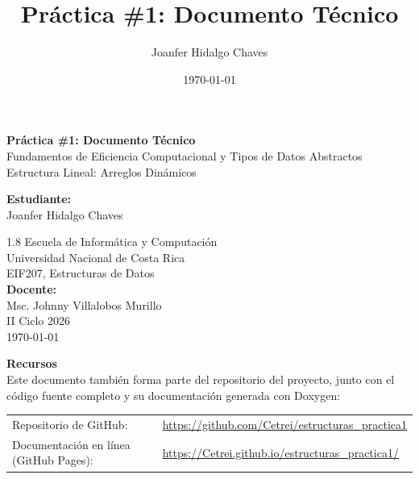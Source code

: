 \documentclass[12pt,letterpaper]{article}
\title{Práctica \#1: Documento Técnico}
\author{Joanfer Hidalgo Chaves}
\date{\today}
\begin{document}

\begin{titlepage}
\centering
\vspace*{1.5cm}

\Large{\textbf{Práctica \#1: Documento Técnico}}\\[6pt]
\large{Fundamentos de Eficiencia Computacional y Tipos de Datos Abstractos}\\[6pt]
Estructura Lineal: Arreglos Dinámicos\\

\vspace{1.5cm}

\textbf{Estudiante:}\\
Joanfer Hidalgo Chaves

\vspace{1.5cm}

\begin{spacing}{1.8}
Escuela de Informática y Computación\\
Universidad Nacional de Costa Rica\\
EIF207, Estructuras de Datos\\[10pt]
\textbf{Docente:} \\
Msc. Johnny Villalobos Murillo\\[1.5cm]
II Ciclo 2026\\
\today
\end{spacing}

\vfill
\end{titlepage}

\newpage
\tableofcontents

\begin{center}
\begin{minipage}{1\textwidth}
\centering
\small
\textbf{Recursos} \\[0.3em]
Este documento también forma parte del repositorio del proyecto, junto con el código fuente completo y su documentación generada con Doxygen:
\vspace{0.3em}

\begin{tabular}{ll}
Repositorio de GitHub: & \url{https://github.com/Cetrei/estructuras_practica1} \\
Documentación en línea (GitHub Pages): & \url{https://Cetrei.github.io/estructuras_practica1/} \\
\end{tabular}
\end{minipage}
\end{center}
\newpage
\end{document}
